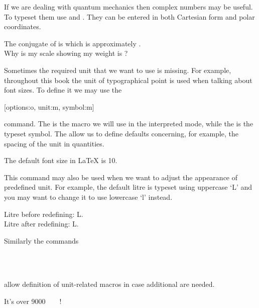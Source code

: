 If we are dealing with quantum mechanics then complex numbers may be useful. To
typeset them use  and . They can be entered in
both Cartesian form and polar coordinates.
\begin{example}[examplewidth=0.5\linewidth]
The conjugate of
 is
which is approximately
. \\
Why is my scale showing my
weight is
?
\end{example}

Sometimes the required unit that we want to use is missing. For example,
throughout this book the unit of typographical point is used when talking about
font sizes. To define it we may use the
\begin{lscommand}
  [options:o, unit:m, symbol:m]
\end{lscommand}
command. The  is the macro we will use in the interpreted mode,
while the  is the typeset symbol. The  allow us to
define defaults concerning, for example, the spacing of the unit in
quantities.
\begin{example}
The default font size
in \LaTeX{} is \qty{10}{\pt}.
\end{example}

This command may also be used when we want to adjust the appearance of
predefined unit. For example, the default litre is typeset using uppercase
\enquote*{L} and you may want to change it to use lowercase \enquote*{l}
instead.
\begin{example}
Litre before redefining:
\unit{\L}. \\
Litre after redefining:
\unit{\L}.
\end{example}

Similarly the commands
\begin{lscommand}
      \\
       \\
\end{lscommand}
allow definition of unit-related macros in case additional are needed.
\begin{example}[examplewidth=0.8\linewidth, vertical_mode]

It's over \qty{9000}{\quartic\decakilo\pt\polymer}!
\end{example}

